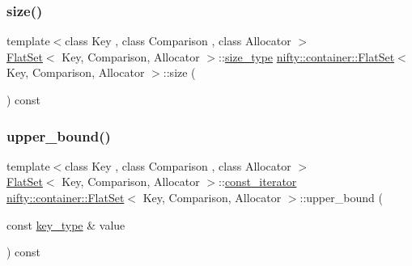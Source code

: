 \mbox{\label{classnifty_1_1container_1_1FlatSet_a6d265f3f83e18a1342a172acaf57a15c}} 
\subsubsection{\texorpdfstring{size()}{size()}}
{\footnotesize\ttfamily template$<$class Key , class Comparison , class Allocator $>$ \\
\hyperlink{classnifty_1_1container_1_1FlatSet}{Flat\+Set}$<$ Key, Comparison, Allocator $>$\+::\hyperlink{classnifty_1_1container_1_1FlatSet_a06ddeba4c1be37279497ed698dfeb812}{size\+\_\+type} \hyperlink{classnifty_1_1container_1_1FlatSet}{nifty\+::container\+::\+Flat\+Set}$<$ Key, Comparison, Allocator $>$\+::size (\begin{DoxyParamCaption}{ }\end{DoxyParamCaption}) const\hspace{0.3cm}{\ttfamily [inline]}}

\mbox{\label{classnifty_1_1container_1_1FlatSet_a0ac07324feb622244c7f91bcf153af87}} 
\subsubsection{\texorpdfstring{upper\+\_\+bound()}{upper\_bound()}\hspace{0.1cm}{\footnotesize\ttfamily [1/2]}}
{\footnotesize\ttfamily template$<$class Key , class Comparison , class Allocator $>$ \\
\hyperlink{classnifty_1_1container_1_1FlatSet}{Flat\+Set}$<$ Key, Comparison, Allocator $>$\+::\hyperlink{classnifty_1_1container_1_1FlatSet_a0f4cd26da060859b18742abfd534aa24}{const\+\_\+iterator} \hyperlink{classnifty_1_1container_1_1FlatSet}{nifty\+::container\+::\+Flat\+Set}$<$ Key, Comparison, Allocator $>$\+::upper\+\_\+bound (\begin{DoxyParamCaption}\item[{const \hyperlink{classnifty_1_1container_1_1FlatSet_a0101a4574052389646be8d9bf092a949}{key\+\_\+type} \&}]{value }\end{DoxyParamCaption}) const\hspace{0.3cm}{\ttfamily [inline]}}


